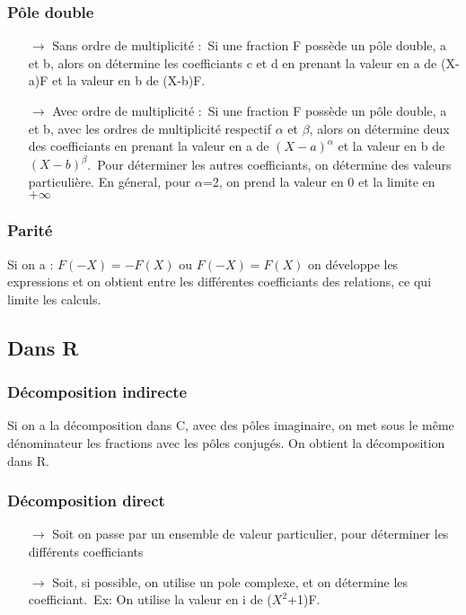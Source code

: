 \subsubsection{Pôle double}
\begin{itemize}
 \item[$\rightarrow$]Sans ordre de multiplicité :\ Si une fraction F possède un pôle double, a et b, alors on détermine les coefficiants c et d en prenant la valeur en a de (X-a)F et la valeur en b de (X-b)F.
 \item[$\rightarrow$] Avec ordre de multiplicité :\ Si une fraction F possède un pôle double, a et b, avec les ordres de multiplicité respectif $\alpha$ et $\beta$, alors on détermine deux des coefficiants en prenant la valeur en a de $(X-a)^{\alpha}$ et la valeur en b de $(X-b)^{\beta}$.\
Pour déterminer les autres coefficiants, on détermine des valeurs particulière. En géneral, pour $\alpha$=2, on prend la valeur en 0 et la limite en $+\infty$
\end{itemize}
\subsubsection{Parité}
Si on a : $F(-X) = -F(X)$ ou $F(-X)=F(X)$ on développe les expressions et on obtient entre les différentes coefficiants des relations, ce qui limite les calculs.
\subsection{Dans R}
\subsubsection{Décomposition indirecte}
Si on a la décomposition dans C, avec des pôles imaginaire, on met sous le même dénominateur les fractions avec les pôles conjugés. On obtient la décomposition dans R.
\subsubsection{Décomposition direct}
\begin{itemize}
 \item[$\rightarrow$] Soit on passe par un ensemble de valeur particulier, pour déterminer les différents coefficiants
 \item[$\rightarrow$] Soit, si possible, on utilise un pole complexe, et on détermine les coefficiant.\ Ex: On utilise la valeur en i de ($X^2$+1)F.
\end{itemize}
